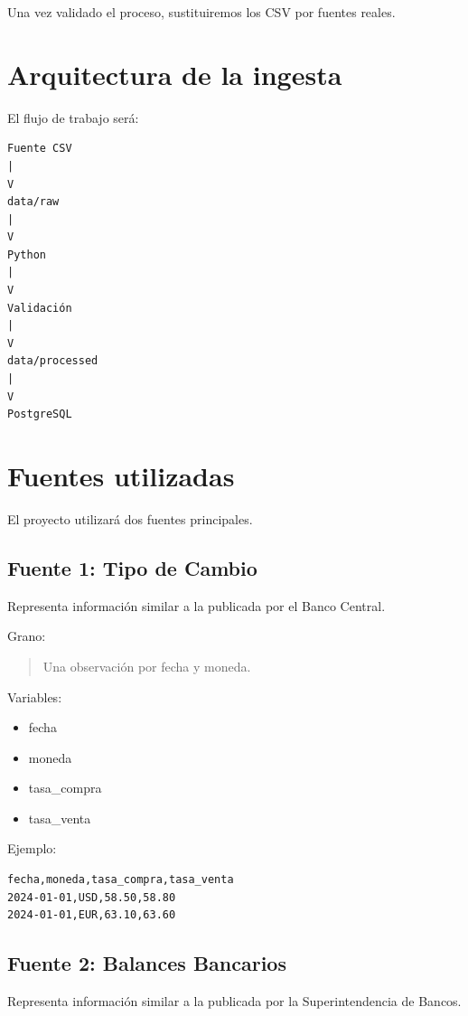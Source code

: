 Una vez validado el proceso, sustituiremos los CSV por fuentes reales.

\section{Arquitectura de la ingesta}

El flujo de trabajo será:

\begin{verbatim}
Fuente CSV
|
V
data/raw
|
V
Python
|
V
Validación
|
V
data/processed
|
V
PostgreSQL
\end{verbatim}

\section{Fuentes utilizadas}

El proyecto utilizará dos fuentes principales.

\subsection{Fuente 1: Tipo de Cambio}

Representa información similar a la publicada por el Banco Central.

Grano:

\begin{quote}
Una observación por fecha y moneda.
\end{quote}

Variables:

\begin{itemize}
\item fecha
\item moneda
\item tasa\_compra
\item tasa\_venta
\end{itemize}

Ejemplo:

\begin{verbatim}
fecha,moneda,tasa_compra,tasa_venta
2024-01-01,USD,58.50,58.80
2024-01-01,EUR,63.10,63.60
\end{verbatim}

\subsection{Fuente 2: Balances Bancarios}

Representa información similar a la publicada por la Superintendencia de Bancos.

